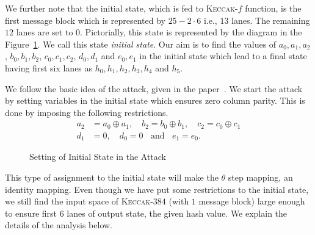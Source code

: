 \documentclass[runningheads]{llncs}
\newcommand{\Keccak}{\mbox{\textsc{Keccak}}}
\begin{document}
We further note that the initial state, which is fed to \Keccak-$f$ function, is the first message block which is represented by $25-2\cdot 6$ i.e., $13$ lanes. The remaining $12$ lanes are set to $0$. Pictorially, this state is represented by the diagram in the Figure~\ref{initial_state}. We call this state \emph{initial state}.
Our aim is to find the values of $a_0, a_1, a_2$, $b_0, b_1, b_2$, $c_0, c_1, c_2$, $d_0, d_1$ and $e_0, e_1$ in the initial state which lead to a final state having first six lanes as $h_0, h_1, h_2,h_3, h_4$ and $h_5$. 

We follow the basic idea of the attack, given in the paper~\cite{naya2011practical}.
We start the attack by setting variables in the initial state which ensures zero column parity. 
This is done by imposing the following restrictions.
\begin{align}\nonumber
a_2 &= a_0 \oplus a_1,\quad b_2 = b_0 \oplus b_1, \quad c_2 = c_0 \oplus c_1\\ \label{cond_state1}
d_1 & = 0,\quad d_0 = 0\;\;\text{ and }\;\; e_1 = e_0. 
\end{align}

\begin{figure}
\begin{center}
\end{center}
\caption{Setting of Initial State in the Attack\label{initial_state}}
\end{figure}
This type of assignment to the initial state will make the {$\theta$} step mapping, an identity mapping. Even though we have put some restrictions to the initial state, we still find the input space of \Keccak-$384$ (with $1$ message block) large enough to ensure first $6$ lanes of output state, the given hash value. We explain the details of the analysis below. 
\end{document}
